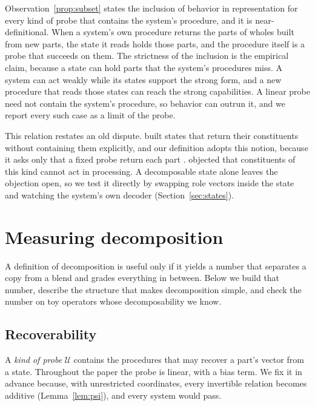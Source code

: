 \documentclass[10pt]{article}
\theoremstyle{plain}
\theoremstyle{remark}
\newcommand{\U}{\mathcal{U}}
\begin{document}
Observation~\ref{prop:subset} states the inclusion of behavior in representation for every kind of probe that contains the system's procedure, and it is near-definitional. When a system's own procedure returns the parts of wholes built from new parts, the state it reads holds those parts, and the procedure itself is a probe that succeeds on them. The strictness of the inclusion is the empirical claim, because a state can hold parts that the system's procedures miss. A system can act weakly while its states support the strong form, and a new procedure that reads those states can reach the strong capabilities. A linear probe need not contain the system's procedure, so behavior can outrun it, and we report every such case as a limit of the probe.

This relation restates an old dispute. \citet{smolensky1990} built states that return their constituents without containing them explicitly, and our definition adopts this notion, because it asks only that a fixed probe return each part \citep[cf.][]{vangelder1990}. \citet{fodor1990} objected that constituents of this kind cannot act in processing. A decomposable state alone leaves the objection open, so we test it directly by swapping role vectors inside the state and watching the system's own decoder (Section~\ref{sec:states}).

\section{Measuring decomposition}
\label{sec:repcomp}

A definition of decomposition is useful only if it yields a number that separates a copy from a blend and grades everything in between. Below we build that number, describe the structure that makes decomposition simple, and check the number on toy operators whose decomposability we know.

\subsection{Recoverability}

A \emph{kind of probe} $\U$ contains the procedures that may recover a part's vector from a state. Throughout the paper the probe is linear, with a bias term. We fix it in advance because, with unrestricted coordinates, every invertible relation becomes additive (Lemma~\ref{lem:psi}), and every system would pass.
\end{document}
